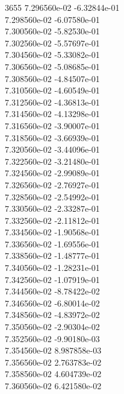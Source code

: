 3655	7.296560e-02	-6.32844e-01	\\ 	7.298560e-02	-6.07580e-01	\\ 	7.300560e-02	-5.82530e-01	\\ 	7.302560e-02	-5.57697e-01	\\ 	7.304560e-02	-5.33082e-01	\\ 	7.306560e-02	-5.08685e-01	\\ 	7.308560e-02	-4.84507e-01	\\ 	7.310560e-02	-4.60549e-01	\\ 	7.312560e-02	-4.36813e-01	\\ 	7.314560e-02	-4.13298e-01	\\ 	7.316560e-02	-3.90007e-01	\\ 	7.318560e-02	-3.66939e-01	\\ 	7.320560e-02	-3.44096e-01	\\ 	7.322560e-02	-3.21480e-01	\\ 	7.324560e-02	-2.99089e-01	\\ 	7.326560e-02	-2.76927e-01	\\ 	7.328560e-02	-2.54992e-01	\\ 	7.330560e-02	-2.33287e-01	\\ 	7.332560e-02	-2.11812e-01	\\ 	7.334560e-02	-1.90568e-01	\\ 	7.336560e-02	-1.69556e-01	\\ 	7.338560e-02	-1.48777e-01	\\ 	7.340560e-02	-1.28231e-01	\\ 	7.342560e-02	-1.07919e-01	\\ 	7.344560e-02	-8.78422e-02	\\ 	7.346560e-02	-6.80014e-02	\\ 	7.348560e-02	-4.83972e-02	\\ 	7.350560e-02	-2.90304e-02	\\ 	7.352560e-02	-9.90180e-03	\\ 	7.354560e-02	8.987858e-03	\\ 	7.356560e-02	2.763783e-02	\\ 	7.358560e-02	4.604739e-02	\\ 	7.360560e-02	6.421580e-02	\\ \hline

